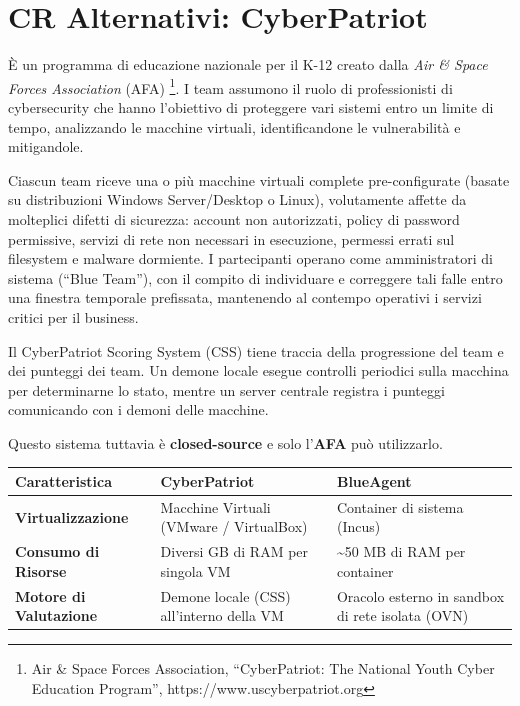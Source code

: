 \pagebreak

\section{CR Alternativi:
CyberPatriot}\label{cr-alternativi-cyberpatriot}

È un programma di educazione nazionale per il K-12 creato dalla
\emph{Air \& Space Forces Association} (AFA) \footnote{\label{fn:ref_12}Air \& Space
  Forces Association, ``CyberPatriot: The National Youth Cyber Education
  Program'', https://www.uscyberpatriot.org}. I team assumono il ruolo
di professionisti di cybersecurity che hanno l'obiettivo di proteggere
vari sistemi entro un limite di tempo, analizzando le macchine virtuali,
identificandone le vulnerabilità e mitigandole.

Ciascun team riceve una o più macchine virtuali complete pre-configurate
(basate su distribuzioni Windows Server/Desktop o Linux), volutamente
affette da molteplici difetti di sicurezza: account non autorizzati,
policy di password permissive, servizi di rete non necessari in
esecuzione, permessi errati sul filesystem e malware dormiente. I
partecipanti operano come amministratori di sistema (``Blue Team''), con
il compito di individuare e correggere tali falle entro una finestra
temporale prefissata, mantenendo al contempo operativi i servizi critici
per il business.

Il CyberPatriot Scoring System (CSS) tiene traccia della progressione
del team e dei punteggi dei team. Un demone locale esegue controlli
periodici sulla macchina per determinarne lo stato, mentre un server
centrale registra i punteggi comunicando con i demoni delle macchine.

Questo sistema tuttavia è \textbf{closed-source} e solo l'\textbf{AFA}
può utilizzarlo.

\begin{longtable}[]{@{}
  >{\raggedright\arraybackslash}p{}
  >{\raggedright\arraybackslash}p{}
  >{\raggedright\arraybackslash}p{}@{}}
\toprule\noalign{}
\begin{minipage}[b]{\linewidth}\raggedright
Caratteristica
\end{minipage} & \begin{minipage}[b]{\linewidth}\raggedright
CyberPatriot
\end{minipage} & \begin{minipage}[b]{\linewidth}\raggedright
BlueAgent
\end{minipage} \\
\midrule\noalign{}
\endhead
\bottomrule\noalign{}
\endlastfoot
\textbf{Virtualizzazione} & Macchine Virtuali (VMware / VirtualBox) &
Container di sistema (Incus) \\
\textbf{Consumo di Risorse} & Diversi GB di RAM per singola VM &
\textasciitilde50 MB di RAM per container \\
\textbf{Motore di Valutazione} & Demone locale (CSS) all'interno della
VM & Oracolo esterno in sandbox di rete isolata (OVN) \\
\end{longtable}
